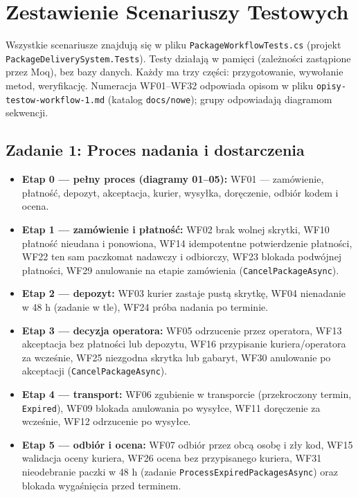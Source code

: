 \documentclass[10.5pt,a4paper]{article}
\begin{document}
\newpage
\section{Zestawienie Scenariuszy Testowych}

{\sloppy Wszystkie scenariusze znajdują się w pliku \texttt{PackageWorkflowTests.cs} (projekt \texttt{PackageDeliverySystem.Tests}). Testy działają w pamięci (zależności zastąpione przez Moq), bez bazy danych. Każdy ma trzy części: przygotowanie, wywołanie metod, weryfikację. Numeracja WF01--WF32 odpowiada opisom w pliku \texttt{opisy-testow-workflow-1.md} (katalog \texttt{docs/nowe}); grupy odpowiadają diagramom sekwencji.\par}

\subsection{Zadanie 1: Proces nadania i dostarczenia}
\begin{itemize}[leftmargin=*,itemsep=1.5pt]
    \item \textbf{Etap 0 --- pełny proces (diagramy 01--05):} WF01 --- zamówienie, płatność, depozyt, akceptacja, kurier, wysyłka, doręczenie, odbiór kodem i ocena.
    \item \textbf{Etap 1 --- zamówienie i płatność:} WF02 brak wolnej skrytki, WF10 płatność nieudana i ponowiona, WF14 idempotentne potwierdzenie płatności, WF22 ten sam paczkomat nadawczy i odbiorczy, WF23 blokada podwójnej płatności, WF29 anulowanie na etapie zamówienia (\texttt{CancelPackageAsync}).
    \item \textbf{Etap 2 --- depozyt:} WF03 kurier zastaje pustą skrytkę, WF04 nienadanie w 48 h (zadanie w tle), WF24 próba nadania po terminie.
    \item \textbf{Etap 3 --- decyzja operatora:} WF05 odrzucenie przez operatora, WF13 akceptacja bez płatności lub depozytu, WF16 przypisanie kuriera/operatora za wcześnie, WF25 niezgodna skrytka lub gabaryt, WF30 anulowanie po akceptacji (\texttt{CancelPackageAsync}).
    \item \textbf{Etap 4 --- transport:} WF06 zgubienie w transporcie (przekroczony termin, \texttt{Expired}), WF09 blokada anulowania po wysyłce, WF11 doręczenie za wcześnie, WF12 odrzucenie po wysyłce.
    \item \textbf{Etap 5 --- odbiór i ocena:} WF07 odbiór przez obcą osobę i zły kod, WF15 walidacja oceny kuriera, WF26 ocena bez przypisanego kuriera, WF31 nieodebranie paczki w 48 h (zadanie \texttt{ProcessExpiredPackagesAsync}) oraz blokada wygaśnięcia przed terminem.
\end{itemize}
\end{document}
